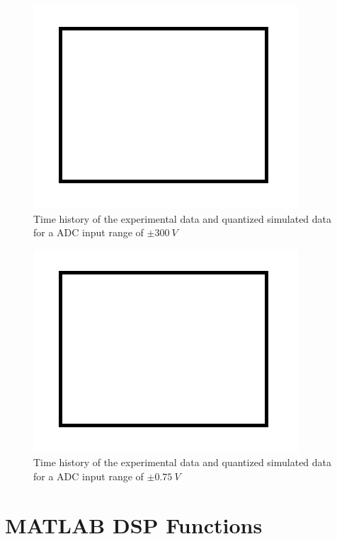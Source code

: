 \documentclass[10pt,letterpaper,twocolumn]{article}
\begin{document}
    \begin{figure}[h]
        \centering
        \includegraphics[width=0.6\linewidth]{img/sample}
        \captionsetup{width=0.6\textwidth}
        \caption{Time history of the experimental data and quantized simulated data for a ADC input range of $\pm 300\ V$}
        \label{fig:range300}
    \end{figure}
    
    \begin{figure}[h]
        \centering
        \includegraphics[width=0.6\linewidth]{img/sample}
        \captionsetup{width=0.6\textwidth}
        \caption{Time history of the experimental data and quantized simulated data for a ADC input range of $\pm 0.75\ V$}
        \label{fig:range075}
    \end{figure}

\clearpage

\section{MATLAB DSP Functions}
    
\end{document}
